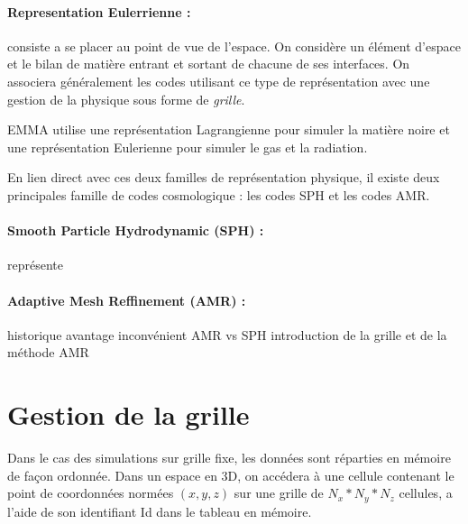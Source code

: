 \paragraph{Representation Eulerrienne : } 
consiste a se placer au point de vue de l'espace.
On considère un élément d'espace et le bilan de matière entrant et sortant de chacune de ses interfaces.
On associera généralement les codes utilisant ce type de représentation avec une gestion de la physique sous forme de \emph{grille}.

EMMA utilise une représentation Lagrangienne pour simuler la matière noire et une représentation Eulerienne pour simuler le gas et la radiation.

En lien direct avec ces deux familles de représentation physique, il existe deux principales famille de codes cosmologique : les codes SPH et les codes AMR.



\paragraph{Smooth Particle Hydrodynamic (SPH) : } représente 

\paragraph{Adaptive Mesh Reffinement (AMR) :  }




historique
avantage inconvénient AMR vs SPH
introduction de la grille et de la méthode AMR

\section{Gestion de la grille}

Dans le cas des simulations sur grille fixe, les données sont réparties en mémoire de façon ordonnée.
Dans un espace en 3D, on accédera à une cellule contenant le point de coordonnées normées $(x,y,z)$ sur une grille de $N_x*N_y*N_z$ cellules, a l'aide de son identifiant Id dans le tableau en mémoire.

